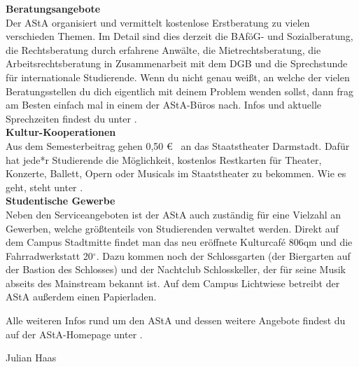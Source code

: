{    \noindent\textbf{Beratungsangebote}\\
    Der AStA organisiert und vermittelt kostenlose Erstberatung zu vielen verschieden Themen. Im Detail sind dies derzeit die BAföG- und Sozialberatung, die Rechtsberatung durch erfahrene Anwälte, die Mietrechtsberatung, die Arbeitsrechtsberatung in Zusammenarbeit mit dem DGB und die Sprechstunde für internationale Studierende. Wenn du nicht genau weißt, an welche der vielen Beratungsstellen du dich eigentlich mit deinem Problem wenden sollst, dann frag am Besten einfach mal in einem der AStA-Büros nach. Infos und aktuelle Sprechzeiten findest du unter \footnotemark[4].\\

    \noindent\textbf{Kultur-Kooperationen}\\
    Aus dem Semesterbeitrag gehen 0,50 \euro~ an das Staatstheater Darmstadt. Dafür hat jede*r Studierende die Möglichkeit, kostenlos Restkarten für Theater, Konzerte, Ballett, Opern oder Musicals im Staatstheater zu bekommen. Wie es geht, steht unter \footnotemark[5].\\

    \noindent\textbf{Studentische Gewerbe}\\
    Neben den Serviceangeboten ist der AStA auch zuständig für eine Vielzahl an Gewerben, welche größtenteils von Studierenden verwaltet werden. Direkt auf dem Campus Stadtmitte findet man das neu eröffnete Kulturcaf\'e 806qm und die Fahrradwerkstatt 20$^\circ$. Dazu kommen noch der Schlossgarten (der Biergarten auf der Bastion des Schlosses) und der Nachtclub Schlosskeller, der für seine Musik abseits des Mainstream bekannt ist. Auf dem Campus Lichtwiese betreibt der AStA außerdem einen Papierladen.

    Alle weiteren Infos rund um den AStA und dessen weitere Angebote findest du auf der AStA-Homepage unter \footnotemark[6].
}
{Julian Haas}


\newpage
